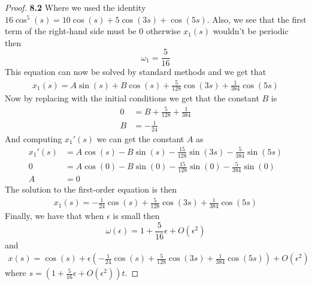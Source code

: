 \documentclass[11pt]{article}
\theoremstyle{definition}
\begin{document}
\begin{proof}{\textbf{8.2}}
        Where we used the identity $16\cos^5(s) = 10\cos(s) + 5\cos(3s) + \cos(5s)$.
        Also, we see that the first term of the right-hand side must be 0
        otherwise $x_1(s)$ wouldn't be periodic then
        $$\omega_1 = \frac{5}{16}$$
        This equation can now be solved by standard methods and we get that
        \begin{align*}
            x_1(s) = A\sin(s) + B\cos(s) + \frac{5}{128}\cos(3s) + \frac{1}{384}\cos(5s)
        \end{align*}
        Now by replacing with the initial conditions we get that the constant
        $B$ is
        \begin{align*}
            0 &=  B + \frac{5}{128} + \frac{1}{384}\\
            B &= -\frac{1}{24}
        \end{align*}
        And computing $x_1'(s)$ we can get the constant $A$ as
        \begin{align*}
            x_1'(s) &= A\cos(s) - B\sin(s) -\frac{15}{128}\sin(3s) -\frac{5}{384}\sin(5s) \\
            0 &= A\cos(0) - B\sin(0) -\frac{15}{128}\sin(0) -\frac{5}{384}\sin(0) \\
            A &= 0
        \end{align*}
        The solution to the first-order equation is then
        \begin{align*}
            x_1(s) = -\frac{1}{24}\cos(s) + \frac{5}{128}\cos(3s) + \frac{1}{384}\cos(5s)
        \end{align*}
        Finally, we have that when $\epsilon$ is small then
        $$\omega(\epsilon) = 1 + \frac{5}{16}\epsilon + O(\epsilon^2)$$
        and
        \begin{align*}
            x(s) = \cos(s) + \epsilon\left(-\frac{1}{24}\cos(s) +
            \frac{5}{128}\cos(3s) + \frac{1}{384}\cos(5s)\right) + O(\epsilon^2)
        \end{align*}
        where $s = (1 + \frac{5}{16}\epsilon + O(\epsilon^2))t$.
    \end{proof}
\cleardoublepage
\end{document}

